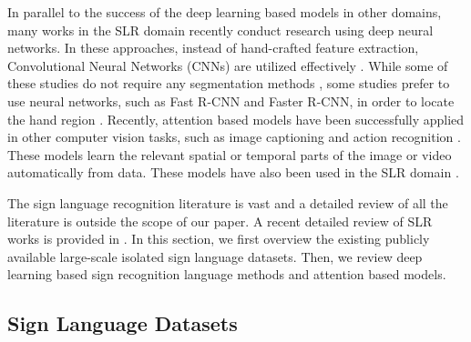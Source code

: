 \documentclass[11pt, a4paper, singlecolumn]{article}
\begin{document}
In parallel to the success of the deep learning based models in other domains, many works in the SLR domain recently conduct research using deep neural networks. In these approaches, instead of hand-crafted feature extraction, Convolutional Neural Networks (CNNs) are utilized effectively \cite{sincan2019isolated, li2020word, pigou2018beyond, li2018deep, lim2019isolated, koller2018deep, tur2019isolated, shi2018american, joze2018ms}. While some of these studies do not require any segmentation methods \cite{sincan2019isolated, li2020word, pigou2018beyond, tur2019isolated}, some studies prefer to use neural networks, such as Fast R-CNN and Faster R-CNN, in order to locate the hand region \cite{li2018deep, lim2019isolated, shi2018american}. Recently, attention based models have been successfully applied in other computer vision tasks, such as image captioning \cite{xu2015show} and action recognition \cite{sharma2015action}. These models learn the relevant spatial or temporal parts of the image or video automatically from data. These models have also been used in the SLR domain \cite{shi2019fingerspelling, huang2018attention, guo2018hierarchical, li2018deep, shi2018american}.

The sign language recognition literature is vast and a detailed review of all the literature is outside the scope of our paper. A recent detailed review of SLR works is provided in \cite{SLRReview2019}. In this section, we first overview the existing publicly available large-scale isolated sign language datasets. Then, we review deep learning based sign recognition language methods and attention based models.

\subsection{Sign Language Datasets}
\label{sec:SRLDatasets}
\end{document}

